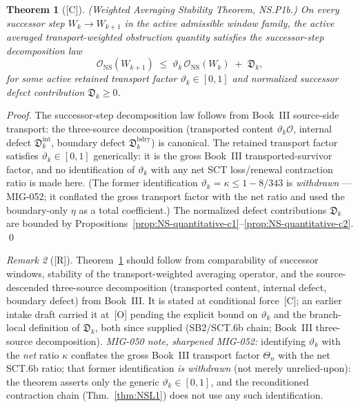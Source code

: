 \documentclass[12pt,oneside]{amsbook}
\theoremstyle{plain}
\newtheorem{theorem}{Theorem}[section]
\theoremstyle{definition}
\theoremstyle{remark}
\newtheorem{remark}[theorem]{Remark}
\newcommand{\status}[1]{\textup{[#1]}}
\begin{document}
\begin{theorem}[\status{C}]\label{thm:NSP1b}
\textup{(Weighted Averaging Stability Theorem, NS.P1b.)} On
every successor step $W_k \to W_{k+1}$ in the active admissible
window family, the active averaged transport-weighted obstruction
quantity satisfies the successor-step decomposition law
\[
 \mathcal{O}_{\mathrm{NS}}(W_{k+1})
 \;\leq\;
 \vartheta_k\,\mathcal{O}_{\mathrm{NS}}(W_k)
 \;+\;
 \mathfrak{D}_k,
\]
for some active retained transport factor $\vartheta_k \in
[0,1]$ and normalized successor defect contribution
$\mathfrak{D}_k \geq 0$.
\end{theorem}
\begin{proof}
The successor-step decomposition law follows from Book~III
source-side transport: the three-source decomposition
(transported content $\vartheta_k \mathcal{O}$, internal defect
$\mathfrak{D}_k^{\mathrm{int}}$, boundary defect
$\mathfrak{D}_k^{\mathrm{bdry}}$) is canonical. The retained
transport factor satisfies $\vartheta_k \in [0,1]$ generically:
it is the gross Book~III transported-survivor factor, and no
identification of $\vartheta_k$ with any net SCT loss/renewal
contraction ratio is made here. (The former identification
$\vartheta_k = \kappa \leq 1-8/343$ is \emph{withdrawn} ---
MIG-052; it conflated the gross transport factor with the net
ratio and used the boundary-only $\eta$ as a total coefficient.)
The normalized defect contributions $\mathfrak{D}_k$ are bounded
by Propositions~\ref{prop:NS-quantitative-c1}--\ref{prop:NS-quantitative-c2}.
\qed
\end{proof}


\begin{remark}[\status{R}]
Theorem~\ref{thm:NSP1b} should follow from comparability of
successor windows, stability of the transport-weighted averaging
operator, and the source-descended three-source decomposition
(transported content, internal defect, boundary defect) from
Book~III. It is stated at conditional force~[C]; an earlier intake draft
carried it at~[O] pending the explicit bound on $\vartheta_k$ and the
branch-local definition of $\mathfrak{D}_k$, both since supplied
(SB2/SCT.6b chain; Book~III three-source decomposition).
\emph{MIG-050 note, sharpened MIG-052:} identifying $\vartheta_k$
with the \emph{net} ratio $\kappa$ conflates the gross Book~III
transport factor $\Theta_n$ with the net SCT.6b ratio; that former
identification \emph{is withdrawn} (not merely unrelied-upon): the
theorem asserts only the generic $\vartheta_k \in [0,1]$, and the
reconditioned contraction chain (Thm.~\ref{thm:NSL1}) does not use
any such identification.
\end{remark}
\end{document}
